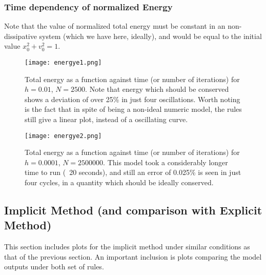 \documentclass{report}
\begin{document}
\subsubsection*{Time dependency of normalized Energy}
Note that the value of normalized total energy must be constant in an non-dissipative system (which we have here, ideally), and would be equal to the initial value $x_0^2 + v_0^2 = 1$.
\begin{figure}[H]
	\centering
	\texttt{[image: energye1.png]}
	\label{en1e}
	\caption{Total energy as a function against time (or number of iterations) for $h=0.01$, $N=2500$. Note that energy which should be conserved shows a deviation of over 25\% in just four oscillations. Worth noting is the fact that in spite of being a non-ideal numeric model, the rules still give a linear plot, instead of a oscillating curve.}
\end{figure}
\begin{figure}[H]
	\centering
	\texttt{[image: energye2.png]}
	\label{en2e}
	\caption{Total energy as a function against time (or number of iterations) for $h=0.0001$, $N=2500000$. This model took a considerably longer time to run (~20 seconds), and still an error of 0.025\% is seen in just four cycles, in a quantity which should be ideally conserved.}
\end{figure}

\subsection*{Implicit Method (and comparison with Explicit Method)}
This section includes plots for the implicit method under similar conditions as that of the previous section. An important inclusion is plots comparing the model outputs under both set of rules.
\end{document}
